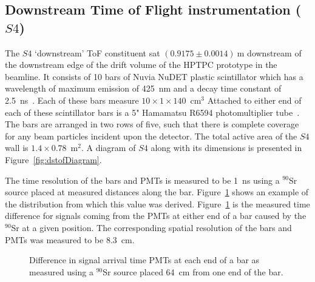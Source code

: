 \subsection{Downstream Time of Flight instrumentation ($\mathit{S4}$)}
\label{subsec:s4Exp}
The $\mathit{S4}$ `downstream' ToF constituent sat $(0.9175 \pm 0.0014)~\text{m}$ downstream of the downstream edge of the drift volume of the HPTPC prototype in the beamline.
It consists of 10 bars of Nuvia NuDET plastic scintillator which has a wavelength of maximum emission of 425~nm and a decay time constant of 2.5~ns~\cite{Nuvia}.
Each of these bars measure $10 \times 1 \times 140$~cm$^3$
Attached to either end of each of these scintillator bars is a 5" Hamamatsu R6594 photomultiplier tube~\cite{Hamamatsu}.
The bars are arranged in two rows of five, such that there is complete coverage for any beam particles incident upon the detector.
The total active area of the $\mathit{S4}$ wall is $1.4 \times 0.78$~m$^2$.
A diagram of $\mathit{S4}$ along with its dimensions is presented in Figure~\ref{fig:dstofDiagram}.

The time resolution of the bars and PMTs is measured to be 1~ns using a $^{90}$Sr source placed at measured distances along the bar.
Figure~\ref{fig:s4Res} shows an example of the distribution from which this value was derived.
Figure~\ref{fig:s4Res} is the measured time difference for signals coming from the PMTs at either end of a bar caused by the $^{90}$Sr at a given position.
The corresponding spatial resolution of the bars and PMTs was measured to be 8.3~cm.

\begin{figure}[h]
	\begin{adjustbox}{max totalsize={.7\textwidth}{.5\textheight},center}
		
	\end{adjustbox}
	\caption{Difference in signal arrival time PMTs at each end of a bar as measured using a $^{90}$Sr source placed 64~cm from one end of the bar.}
	\label{fig:s4Res}	
\end{figure}

